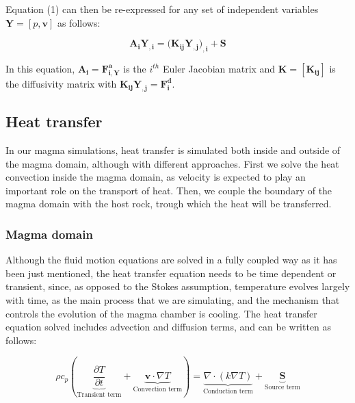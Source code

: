 Equation (1) can then be re-expressed for any set of independent variables $\boldsymbol{Y} = [p,\mathbf{v}]$ as follows:


\begin{equation}
    \boldsymbol{A_iY_{,i}} = (\boldsymbol{K_{ij}Y_{,j})_{,i} + S}
\end{equation}


In this equation, $\boldsymbol{A_i = F^{a}_{i,Y}}$ is the $i^{th}$ Euler Jacobian matrix and $\boldsymbol{K = [K_{ij}]}$ is the diffusivity matrix with $\boldsymbol{K_{ij}Y_{,j} = F^{d}_{i}}$.

\subsection{Heat transfer}
In our magma simulations, heat transfer is simulated both inside and outside of the magma domain, although with different approaches. First we solve the heat convection inside the magma domain, as velocity is expected to play an important role on the transport of heat. Then, we couple the boundary of the magma domain with the host rock, trough which the heat will be transferred.

\subsubsection{Magma domain}
Although the fluid motion equations are solved in a fully coupled way as it has been just mentioned, the heat transfer equation needs to be time dependent or transient, since, as opposed to the Stokes assumption, temperature evolves largely with time, as the main process that we are simulating, and the mechanism that controls the evolution of the magma chamber is cooling. The heat transfer equation solved includes advection and diffusion terms, and can be written as follows:

\begin{equation}
\rho c_p \left(\underbrace{\frac{\partial T}{\partial t}}_{\text{Transient term}} + \underbrace{\mathbf{v} \cdot \nabla T }_{\text{Convection term}}\right) = \underbrace{\nabla \cdot (k \nabla T)}_{\text{Conduction term}} + \underbrace{\mathbf{S}}_{\text{Source term}}
\end{equation}


